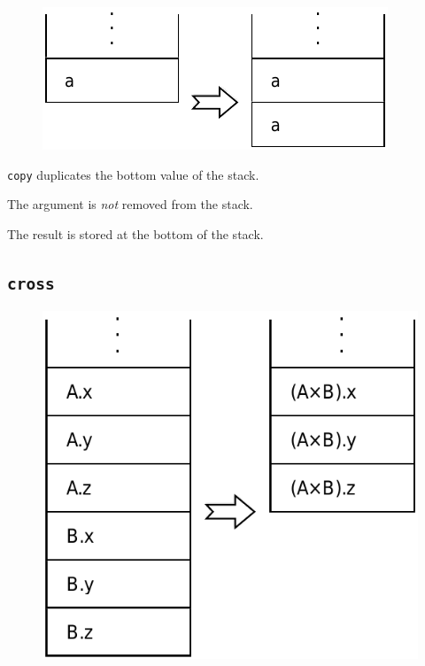 		\begin{figure}
			\begin{flushright}
				\includegraphics[width=\linewidth]{figure/pdf/i_copy} 
			\end{flushright}
		\end{figure}
	
			\texttt{copy} duplicates the bottom value of the stack.
			
			The argument is \emph{not} removed from the stack.
			
			The result is stored at the bottom of the stack.
	
	\qquad
	
	\subsection*{\texttt{cross}}
	
		\begin{figure}
			\begin{flushright}
				\includegraphics[width=\linewidth]{figure/pdf/i_cross} 
			\end{flushright}
		\end{figure}
	
